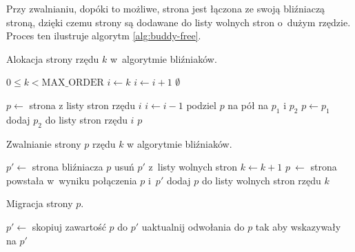 Przy zwalnianiu, dopóki to możliwe, strona jest łączona ze swoją
bliźniaczą stroną, dzięki czemu strony są dodawane do listy wolnych
stron o~dużym rzędzie.  Proces ten ilustruje algorytm
\ref{alg:buddy-free}.

\begin{algorithm}[p]
\caption[Alokacja strony w~algorytmie bliźniaków.]{Alokacja strony
  rzędu $k$ w~algorytmie bliźniaków.}
\label{alg:buddy-alloc}
\begin{algorithmic}[1]
\Require $0 \leq k < \mathrm{MAX\_ORDER}$
    \State $i \gets k$
        \State $i \gets i + 1$
            \State \Return $\emptyset$
        \EndIf
    \EndWhile

    \State $p \gets$ strona z listy stron rzędu $i$
        \State $i \gets i - 1$
        \State podziel $p$ na pół na $p_1$ i $p_2$
        \State $p \gets p_1$
        \State dodaj $p_2$ do listy stron rzędu $i$
    \EndWhile
    \State \Return $p$
\EndFunction
\end{algorithmic}
\end{algorithm}

\begin{algorithm}[p]
\caption[Zwalnianie strony w~algorytmie bliźniaków.]{Zwalnianie strony
  $p$ rzędu $k$ w algorytmie bliźniaków.}
\label{alg:buddy-free}
\begin{algorithmic}[1]
        \State $p' \gets$ strona bliźniacza $p$
        \State usuń $p'$ z~listy wolnych stron
        \State $k \gets k + 1$
        \State $p~\gets$ strona powstała w~wyniku połączenia $p$ i~$p'$ \label{alg:buddy-free:join}
    \EndWhile
    \State dodaj $p$ do listy wolnych stron rzędu $k$ \label{alg:buddy-free:add}
\EndProcedure
\end{algorithmic}
\end{algorithm}

\begin{algorithm}[p]
\caption[Migracja strony.]{Migracja strony $p$.}
\label{alg:migrate}
\begin{algorithmic}[1]
    \State $p' \gets$ 
    \State skopiuj zawartość $p$ do $p'$
    \State uaktualnij odwołania do $p$ tak aby wskazywały na $p'$
    \State {}
\EndProcedure
\end{algorithmic}
\end{algorithm}

